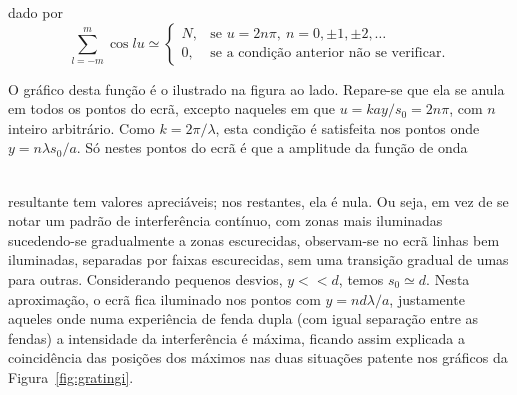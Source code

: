 dado por
\begin{equation}\label{eq:sumcos}
\sum_{l=-m}^m\cos lu\simeq
\begin{cases}
  N,&\text{se }u=2n\pi,\ n=0,\pm1,\pm2,\ldots\\
  0,&\text{se a condição anterior não se verificar.}
\end{cases}
\end{equation}
\begin{minipage}[t]{0.55\linewidth}
O gráfico desta função é o ilustrado na figura ao lado. Repare-se que ela 
se anula em todos os pontos do ecrã, excepto naqueles em que $u=kay/s_0=2n\pi$,
com $n$ inteiro arbitrário. Como $k=2\pi/\lambda$, esta condição é satisfeita
nos pontos onde $y=n\lambda s_0/a$. Só nestes pontos do ecrã é que a amplitude
da função de onda\linebreak
\vspace{-0.6\baselineskip}
\end{minipage}\hfill
{}\\
 resultante tem valores apreciáveis; nos restantes,
 ela é nula.
Ou seja, em vez de se notar um padrão de interferência contínuo, com zonas mais
iluminadas sucedendo-se gradualmente a zonas escurecidas, observam-se no ecrã
linhas bem iluminadas, separadas por faixas escurecidas, sem uma transição
gradual de umas para outras.
Considerando pequenos desvios, $y<<d$, temos $s_0\simeq d$. Nesta aproximação, o
ecrã fica iluminado nos pontos com $y=nd\lambda/a$, justamente aqueles onde numa
experiência de fenda dupla (com igual separação entre as fendas) a intensidade
da interferência é máxima, ficando assim explicada a coincidência das posições
dos máximos nas duas situações patente nos gráficos da
Figura~\ref{fig:gratingi}.


